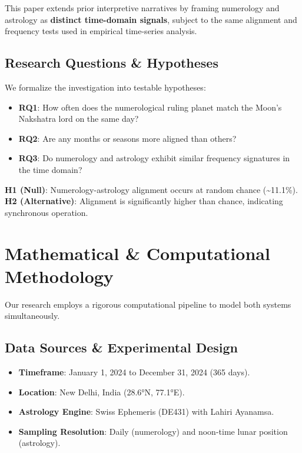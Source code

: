 \documentclass[
  11pt,
  a4paper,
  oneside,
  openany]{article}
\providecommand{\tightlist}{%
  \setlength{\itemsep}{0pt}\setlength{\parskip}{0pt}}\usepackage{longtable,booktabs,array}
\begin{document}
This paper extends prior interpretive narratives by framing numerology
and astrology as \textbf{distinct time-domain signals}, subject to the
same alignment and frequency tests used in empirical time-series
analysis.

\subsection{Research Questions \&
Hypotheses}\label{research-questions-hypotheses}

We formalize the investigation into testable hypotheses:

\begin{itemize}
\tightlist
\item
  \textbf{RQ1}: How often does the numerological ruling planet match the
  Moon's Nakshatra lord on the same day?
\item
  \textbf{RQ2}: Are any months or seasons more aligned than others?
\item
  \textbf{RQ3}: Do numerology and astrology exhibit similar frequency
  signatures in the time domain?
\end{itemize}

\textbf{H1 (Null)}: Numerology-astrology alignment occurs at random
chance (\textasciitilde11.1\%). \textbf{H2 (Alternative)}: Alignment is
significantly higher than chance, indicating synchronous operation.

\section{Mathematical \& Computational
Methodology}\label{mathematical-computational-methodology}

Our research employs a rigorous computational pipeline to model both
systems simultaneously.

\subsection{Data Sources \& Experimental
Design}\label{data-sources-experimental-design}

\begin{itemize}
\tightlist
\item
  \textbf{Timeframe}: January 1, 2024 to December 31, 2024 (365 days).
\item
  \textbf{Location}: New Delhi, India (28.6°N, 77.1°E).
\item
  \textbf{Astrology Engine}: Swiss Ephemeris (DE431) with Lahiri
  Ayanamsa.
\item
  \textbf{Sampling Resolution}: Daily (numerology) and noon-time lunar
  position (astrology).
\end{itemize}
\end{document}
